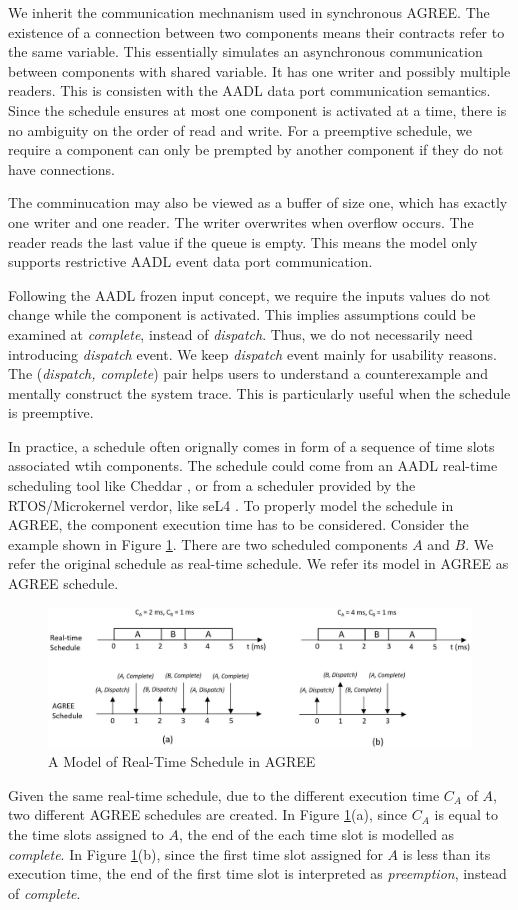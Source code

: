 We inherit the communication mechnanism used in synchronous AGREE. The existence of a connection between two components means their contracts refer to the same variable. 
This essentially simulates an asynchronous communication between components with shared variable. It has one writer and possibly multiple readers. This is consisten with the AADL data port communication semantics.
Since the schedule ensures at most one component is activated at a time, there is no ambiguity on the order of read and write. For a preemptive schedule, we require a component can only be prempted by another component if they do not have connections.

The comminucation may also be viewed as a buffer of size one, which has exactly one writer and one reader. The writer overwrites when overflow occurs. The reader reads the last value if the queue is empty. This means the model only supports restrictive AADL event data port communication.

Following the AADL frozen input concept, we require the inputs values do not change while the component is activated. This implies assumptions could be examined at \emph{complete}, instead of \emph{dispatch}. Thus, we do not necessarily need introducing \emph{dispatch} event. We keep \emph{dispatch} event mainly for usability reasons. The (\emph{dispatch, complete}) pair helps users to understand a counterexample and mentally construct the system trace. This is particularly useful when the schedule is preemptive.

In practice, a schedule often orignally comes in form of a sequence of time slots associated wtih components. 
The schedule could come from an AADL real-time scheduling tool like Cheddar \cite{cheddar}, or from a scheduler provided by the RTOS/Microkernel verdor, like seL4 \cite{sel4}. 
To properly model the schedule in AGREE, the component execution time has to be considered. Consider the example shown in Figure \ref{RTschedule}. There are two scheduled components $A$ and $B$. We refer the original schedule as real-time schedule. We refer its model in AGREE as AGREE schedule.
\begin{figure}[ht!]
\centering
\includegraphics[width=130mm]{RTschedule.jpg}
\caption{A Model of Real-Time Schedule in AGREE\label{RTschedule}}
\end{figure}
Given the same real-time schedule, due to the different execution time $C_A$ of $A$, two different AGREE schedules are created. In Figure \ref{RTschedule}(a), since $C_A$ is equal to the time slots assigned to $A$, the end of the each time slot is modelled as \emph{complete}. In Figure \ref{RTschedule}(b), since the first time slot assigned for $A$ is less than its execution time, the end of the first time slot is interpreted as \emph{preemption}, instead of \emph{complete}.

